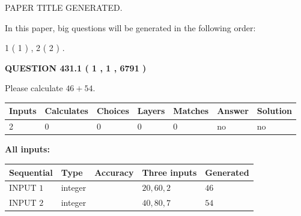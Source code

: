 \documentclass[12pt]{article}
\begin{document}
   
\vspace{0.2in}
   
   
   
   
   
   
   
   
 \vspace{0.2in}
 
 
 
 
   
   
 PAPER TITLE GENERATED.
   
   
   
\vspace{0.2in}
   
In this paper, big questions will be generated in the following order: 
   
   
   1 ( 1 )
 ,
   2 ( 2 )
 .
  
\vspace{0.2in}
  
{\textbf{\Large{QUESTION
431.1 
 ( 1 , 1 , 6791 )
}}}
  
  
 
Please calculate $ %
46 +  %
54 $.
 
 
   
   
   
   
\noindent\begin{tabular}{|l|l|l|l|l|l|l|}
 \hline
Inputs & Calculates & Choices & Layers & Matches & Answer & Solution \\ \hline
 2  & 
 0  & 
 0
  & 
 0  & 
 0  & 
  no & 
  no 
  \\ \hline
 \end{tabular}
   
   
   
   
\noindent{}
   
   
   
   
\noindent\vspace{0.1in}\hspace{-0.08in} {\textbf{\Large{All inputs: }}}
   
   
  
  
\noindent\begin{tabular}{|l|l|l|l|l|}
\hline
 Sequential & Type & Accuracy & Three inputs & Generated \\ 
\hline
 
 
  INPUT $  1 $ & integer &  & $
 20
 , 
 60
 , 
 2
 $ & $ 46 $ 
 \\  \hline  
 
 
  INPUT $  2 $ & integer &  & $
 40
 , 
 80
 , 
 7
 $ & $ 54 $ 
 \\  \hline  
 \end{tabular}
   
\end{document}
